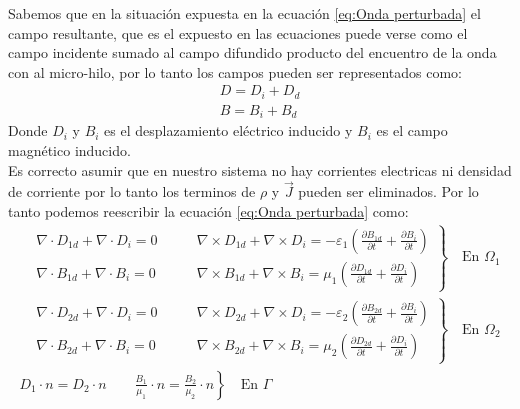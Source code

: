 Sabemos que en la situación expuesta en la ecuación \eqref{eq:Onda perturbada} el campo resultante, que es el expuesto en las ecuaciones puede verse como el campo incidente sumado al campo difundido producto del encuentro de la onda con al micro-hilo, por lo tanto los campos pueden ser representados como:
\begin{equation}
\label{eq:Descomposicion campos}
\begin{split}
D=D_i+D_d\\
B=B_i+B_d
\end{split}
\end{equation}
Donde $D_i$ y $B_i$ es el desplazamiento eléctrico inducido y $B_i$ es el campo magnético inducido.\\
Es correcto asumir que en nuestro sistema no hay corrientes electricas ni densidad de corriente por lo tanto los terminos de $\rho$ y $\vec{J}$ pueden ser eliminados. Por lo tanto podemos reescribir la ecuación \eqref{eq:Onda perturbada} como:
\begin{equation}
\label{eq:Onda perturbada y separada}
\begin{split}
\left.
\begin{aligned}
&\nabla\cdot D_{1d} + \nabla\cdot D_{i} = 0\qquad & \nabla\times D_{1d}+\nabla\times D_i = -\varepsilon_1\left(\frac{\partial B_{1d}}{\partial t}+\frac{\partial B_i}{\partial t}\right)\\
&\nabla\cdot B_{1d} +\nabla\cdot B_i = 0\qquad &  \nabla\times B_{1d}+\nabla\times B_i = \mu_1\left(\frac{\partial D_{1d}}{\partial t}+\frac{\partial D_i}{\partial t}\right)
\end{aligned}
\right\}
\quad\text{En }\Omega_1\\
\left.
\begin{aligned}
&\nabla\cdot D_{2d} + \nabla\cdot D_{i} = 0\qquad & \nabla\times D_{2d}+\nabla\times D_i = -\varepsilon_2\left(\frac{\partial B_{2d}}{\partial t}+\frac{\partial B_i}{\partial t}\right)\\
&\nabla\cdot B_{2d} +\nabla\cdot B_i = 0\qquad &  \nabla\times B_{2d}+\nabla\times B_i = \mu_2\left(\frac{\partial D_{2d}}{\partial t}+\frac{\partial D_i}{\partial t}\right)
\end{aligned}
\right\}
\quad\text{En }\Omega_2\\
\left. 
D_1\cdot n=D_2\cdot n \qquad \frac{B_1}{\mu_1}\cdot n=\frac{B_2}{\mu_2}\cdot n
\right\}
\quad\text{En }\Gamma\\
\end{split}
\end{equation}
